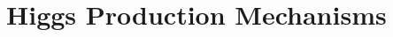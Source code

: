 \cite{Kidonakis:2011wy, Kidonakis:2010ux}




\section{Higgs Production Mechanisms}\label{sec:phenoHiggs}

